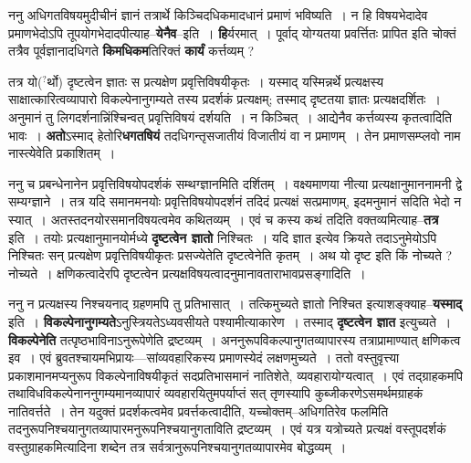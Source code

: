 \documentclass[article,12pt,a4paper]{memoir}
\newcommand{\unclear}[1]{($^{?}$#1)}
\begin{document}
	  \pstart ननु अधिगतविषयमुदीचीनं ज्ञानं तत्रार्थे किञ्चिदधिकमादधानं प्रमाणं भविष्यति । न हि विषयभेदादेव प्रमाणभेदोऽपि तूपयोगभेदादपीत्याह--\textbf{येनैव}--इति । \textbf{हि}र्यरमात् । पूर्वाद् योग्यतया प्रवर्त्तितः प्रापित इति चोक्तं तत्रैव पूर्वज्ञानादधिगते \textbf{किमधिकम}तिरिक्तं \textbf{कार्यं} कर्त्तव्यम् ?  \leavevmode{} 
	  
	तत्र यो\unclear{र्थो} दृष्टत्वेन ज्ञातः स प्रत्यक्षेण प्रवृत्तिविषयीकृतः । यस्माद् यस्मिन्नर्थे प्रत्यक्षस्य साक्षात्कारित्वव्यापारो विकल्पेनानुगम्यते तस्य प्रदर्शकं प्रत्यक्षम्; तस्माद् दृष्टतया ज्ञातः प्रत्यक्षदर्शितः । अनुमानं तु लिगदर्शनान्निंश्चिन्वत् प्रवृत्तिविषयं दर्शयति । न किञ्चित् । आद्येनैव कर्त्तव्यस्य कृतत्वादिति भावः । \textbf{अतो}ऽस्माद् हेतोरि\textbf{धगतषियं} तदधिगन्तृसजातीयं विजातीयं वा न प्रमाणम् । तेन प्रमाणसम्प्लवो नाम नास्त्येवेति प्रकाशितम् ।
	\pend
      

	  \pstart ननु च प्रबन्धेनानेन प्रवृत्तिविषयोपदर्शकं सम्थग्ज्ञानमिति दर्शितम् । वक्ष्यमाणया नीत्या प्रत्यक्षानुमाननामनी द्वे सम्यग्ज्ञाने । तत्र यदि समानमनयोः प्रवृत्तिविषयोपदर्शनं तदिदं प्रत्यक्षं सत्प्रमाणम्, इदमनुमानं सदिति भेदो न स्यात् । अतस्तदनयोरसमानविषयत्वमेव कथितव्यम् । एवं च कस्य कथं तदिति वक्तव्यमित्याह--\textbf{तत्र} इति । तयोः प्रत्यक्षानुमानयोर्मध्ये \textbf{दृष्टत्वेन ज्ञातो} निश्चितः । यदि ज्ञात इत्येव क्रियते तदाऽनुमेयोऽपि निश्चितः सन् प्रत्यक्षेण प्रवृत्तिविषयीकृतः प्रसज्येतेति दृष्टत्वेनेति कृतम् । अथ यो दृष्ट इति किं नोच्यते ? नोच्यते । क्षणिकत्वादेरपि दृष्टत्वेन प्रत्यक्षविषयत्वादनुमानावताराभावप्रसङ्गादिति ।
	\pend
      

	  \pstart ननु न प्रत्यक्षस्य निश्चयनाद् ग्रहणमपि तु प्रतिभासात् । तत्किमुच्यते ज्ञातो निश्चित इत्याशङ्क्याह--\textbf{यस्माद्} इति । \textbf{विकल्पेनानुगम्यते}ऽनुस्त्रियतेऽध्यवसीयते पश्यामीत्याकारेण । तस्माद् \textbf{दृष्टत्वेन ज्ञात} इत्युच्यते । \textbf{विकल्पेनेति} तत्पृष्ठभाविनाऽनुरूपेणेति द्रष्टव्यम् । अननुरूपविकल्पानुगतव्यापारस्य तत्राप्रामाण्यात् क्षणिकत्व इव । एवं ब्रुवतश्चायमभिप्रायः—सांव्यवहारिकस्य प्रमाणस्येदं लक्ष\leavevmode{}णमुच्यते । ततो वस्तुवृत्त्या प्रकाशमानमप्यनुरूप विकल्पेनाविषयीकृतं सदप्रतिभासमानं नातिशेते, व्यवहारायोग्यत्वात् । एवं तद्ग्राहकमपि तथाविधविकल्पेनाननुगम्यमानव्यापारं व्यवहारयितुमपर्याप्तं सत् तृणस्यापि कुब्जीकरणेऽसमर्थमग्राहकं नातिवर्त्तते । तेन यदुक्तं प्रदर्शकत्वमेव प्रवर्त्तकत्वादीति, यच्चोक्तम्--अधिगतिरेव फलमिति तदनुरूपनिश्चयानुगतव्यापारमनुरूपनिश्चयानुगताविति द्रष्टव्यम् । एवं यत्र यत्रोच्यते प्रत्यक्षं वस्तूपदर्शकं वस्तुग्राहकमित्यादिना शब्देन तत्र सर्वत्रानुरूपनिश्चयानुगतव्यापारमेव बोद्धव्यम् ।
	\pend
      
\end{document}
